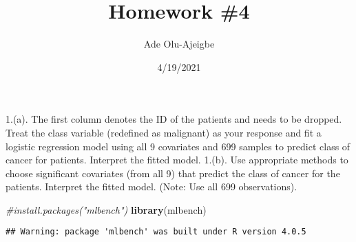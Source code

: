 \documentclass[
]{article}
\title{Homework \#4}
\author{Ade Olu-Ajeigbe}
\date{4/19/2021}
\newenvironment{Shaded}{\begin{snugshade}}{\end{snugshade}}
\newcommand{\CommentTok}[1]{\textcolor[rgb]{0.56,0.35,0.01}{\textit{#1}}}
\newcommand{\DecValTok}[1]{\textcolor[rgb]{0.00,0.00,0.81}{#1}}
\newcommand{\KeywordTok}[1]{\textcolor[rgb]{0.13,0.29,0.53}{\textbf{#1}}}
\newcommand{\NormalTok}[1]{#1}
\newcommand{\OperatorTok}[1]{\textcolor[rgb]{0.81,0.36,0.00}{\textbf{#1}}}
\newcommand{\OtherTok}[1]{\textcolor[rgb]{0.56,0.35,0.01}{#1}}
\newcommand{\StringTok}[1]{\textcolor[rgb]{0.31,0.60,0.02}{#1}}
\begin{document}
\maketitle

1.(a). The first column denotes the ID of the patients and needs to be
dropped. Treat the class variable (redefined as malignant) as your
response and fit a logistic regression model using all 9 covariates and
699 samples to predict class of cancer for patients. Interpret the
fitted model. 1.(b). Use appropriate methods to choose significant
covariates (from all 9) that predict the class of cancer for the
patients. Interpret the fitted model. (Note: Use all 699 observations).

\begin{Shaded}
\begin{Highlighting}[]
\CommentTok{#install.packages("mlbench")}
\KeywordTok{library}\NormalTok{(mlbench)}
\end{Highlighting}
\end{Shaded}

\begin{verbatim}
## Warning: package 'mlbench' was built under R version 4.0.5
\end{verbatim}

\begin{Shaded}
\end{Shaded}
\end{document}
